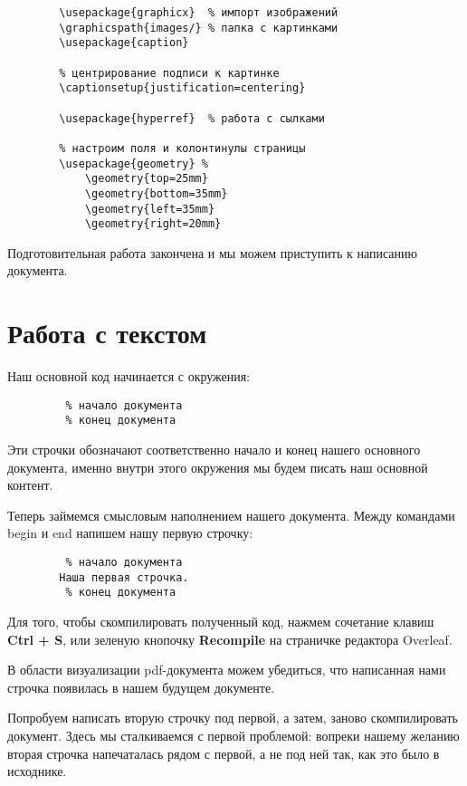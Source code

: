     \begin{verbatim}
        \usepackage{graphicx}  % импорт изображений
        \graphicspath{images/} % папка с картинками
        \usepackage{caption}

        % центрирование подписи к картинке
        \captionsetup{justification=centering}

        \usepackage{hyperref}  % работа с сылками

        % настроим поля и колонтинулы страницы
        \usepackage{geometry} %
            \geometry{top=25mm}
            \geometry{bottom=35mm}
            \geometry{left=35mm}
            \geometry{right=20mm}
    \end{verbatim}

    Подготовительная работа закончена и мы можем приступить к написанию документа.


    \section{Работа с текстом}

    Наш основной код начинается с окружения:
    
    \begin{verbatim}
         % начало документа
         % конец документа
    \end{verbatim}

    Эти строчки обозначают соответственно начало и конец нашего основного документа, именно внутри этого окружения мы будем писать наш основной контент.

    Теперь займемся смысловым наполнением нашего документа. Между 
    командами begin и end напишем нашу первую строчку:

    \begin{verbatim}
         % начало документа
        Наша первая строчка.
         % конец документа
    \end{verbatim}
    Для того, чтобы скомпилировать полученный код, нажмем сочетание
    клавиш \textbf{Ctrl + S}, или зеленую кнопочку \textbf{Recompile} на страничке редактора Overleaf.

    В области визуализации pdf-документа можем убедиться, что написанная нами строчка появилась в нашем будущем документе.

    Попробуем написать вторую строчку под первой, а затем, заново
    скомпилировать документ. Здесь мы сталкиваемся с первой проблемой:
    вопреки нашему желанию вторая строчка напечаталась рядом с первой, а не под ней  
    так, как это было в исходнике.\\[1 cm] 

